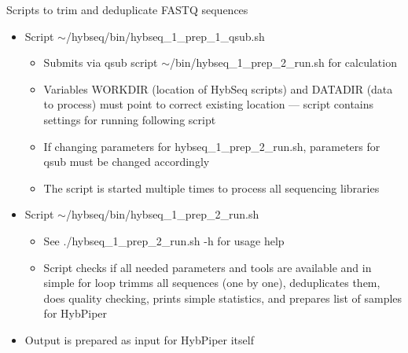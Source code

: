 \documentclass[compress, ucs, xelatex, 11pt, xcolor=x11names, aspectratio=169,
	hyperref={
		bookmarks=true,
		unicode=true,
		colorlinks=true,
		pdftitle={HybSeq course},
		plainpages=false,
		pdfauthor={Vojtech Zeisek},
		pdfsubject={Practical processing of HybSeq target enrichment sequencing data on computing grids like MetaCentrum},
		pdfcreator={XeLaTeX},
		pdfkeywords={BASH, command line, GNU, HybSeq, Linux, MetaCentrum, sequencing shell, target enrichment},
		linkcolor=Turquoise4, %
		anchorcolor=DodgerBlue4, %
		citecolor=DodgerBlue4, %
		filecolor=DodgerBlue4, %
		menucolor=Tan4, %
		urlcolor=DarkOliveGreen4, %
		pdftex},
	url={hyphens, lowtilde} %
	]{beamer}
\renewcommand{\texttt}[1]{\colorbox{Cornsilk2}{{\ttfamily #1}}}
\begin{document}
\begin{frame}{Scripts to trim and deduplicate FASTQ sequences}
	\begin{itemize}
		\item Script \texttt{$\sim$/hybseq/bin/hybseq\_1\_prep\_1\_qsub.sh}
		\begin{itemize}
			\item Submits via \texttt{qsub} script \texttt{$\sim$/bin/hybseq\_1\_prep\_2\_run.sh} for calculation
			\item Variables \texttt{WORKDIR} (location of HybSeq scripts) and \texttt{DATADIR} (data to process) must point to correct existing location --- script contains settings for running following script
			\item If changing parameters for \texttt{hybseq\_1\_prep\_2\_run.sh}, parameters for \texttt{qsub} must be changed accordingly
			\item The script is started multiple times to process all sequencing libraries
		\end{itemize}
		\item Script \texttt{$\sim$/hybseq/bin/hybseq\_1\_prep\_2\_run.sh}
		\begin{itemize}
			\item See \texttt{./hybseq\_1\_prep\_2\_run.sh -h} for usage help
			\item Script checks if all needed parameters and tools are available and in simple \texttt{for} loop trimms all sequences (one by one), deduplicates them, does quality checking, prints simple statistics, and prepares list of samples for HybPiper
		\end{itemize}
		\item Output is prepared as input for HybPiper itself
	\end{itemize}
\end{frame}
\end{document}
